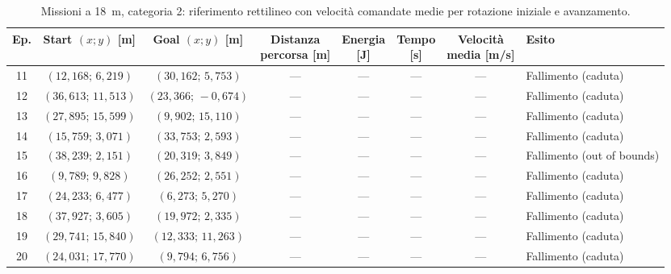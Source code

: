 \begin{table}[H]
\centering
\caption{Missioni a 18~m, categoria 2: riferimento rettilineo con velocità comandate medie per rotazione iniziale e avanzamento.}
\label{tab:big-map-18m-baseline-cat2}
\begingroup
\fontsize{9}{11}\selectfont
\setlength{\tabcolsep}{2.5pt}
\renewcommand{\arraystretch}{1.2}
\begin{tabular}{@{}c cc cccc l@{}}
\toprule
Ep. & \shortstack{Start $(x;y)$\\{}[m]} & \shortstack{Goal $(x;y)$\\{}[m]} & \shortstack{Distanza\\percorsa [m]} & \shortstack{Energia\\{}[J]} & \shortstack{Tempo\\{}[s]} & \shortstack{Velocità\\media [m/s]} & Esito \\
\midrule
11 & $(12{,}168;\,6{,}219)$ & $(30{,}162;\,5{,}753)$ & --- & --- & --- & --- & Fallimento (caduta) \\
12 & $(36{,}613;\,11{,}513)$ & $(23{,}366;\,-0{,}674)$ & --- & --- & --- & --- & Fallimento (caduta) \\
13 & $(27{,}895;\,15{,}599)$ & $(9{,}902;\,15{,}110)$ & --- & --- & --- & --- & Fallimento (caduta) \\
14 & $(15{,}759;\,3{,}071)$ & $(33{,}753;\,2{,}593)$ & --- & --- & --- & --- & Fallimento (caduta) \\
15 & $(38{,}239;\,2{,}151)$ & $(20{,}319;\,3{,}849)$ & --- & --- & --- & --- & Fallimento (out of bounds) \\
16 & $(9{,}789;\,9{,}828)$ & $(26{,}252;\,2{,}551)$ & --- & --- & --- & --- & Fallimento (caduta) \\
17 & $(24{,}233;\,6{,}477)$ & $(6{,}273;\,5{,}270)$ & --- & --- & --- & --- & Fallimento (caduta) \\
18 & $(37{,}927;\,3{,}605)$ & $(19{,}972;\,2{,}335)$ & --- & --- & --- & --- & Fallimento (caduta) \\
19 & $(29{,}741;\,15{,}840)$ & $(12{,}333;\,11{,}263)$ & --- & --- & --- & --- & Fallimento (caduta) \\
20 & $(24{,}031;\,17{,}770)$ & $(9{,}794;\,6{,}756)$ & --- & --- & --- & --- & Fallimento (caduta) \\
\bottomrule
\end{tabular}
\endgroup
\end{table}

